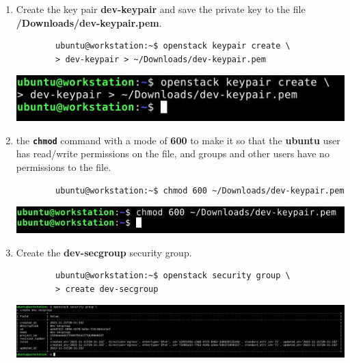 \documentclass[letterpaper, 12pt]{article}
\begin{document}
\begin{enumerate}
    \item Create the key pair \textbf{dev-keypair} and save the private key to the file
    \textbf{\texttildemid/Downloads/dev-keypair.pem}.
    \begin{lstlisting}
        ubuntu@workstation:~$ openstack keypair create \
        > dev-keypair > ~/Downloads/dev-keypair.pem
    \end{lstlisting}

    \begin{center}
        \includegraphics[width=\linewidth]{images/part4/step15.png}
    \end{center}

    \item the \textbf{\texttt{chmod}} command with a mode of \textbf{600} to make it so that the \textbf{ubuntu} user
    has read/write permissions on the file, and groups and other users have no permissions to the file.
    \begin{lstlisting}
        ubuntu@workstation:~$ chmod 600 ~/Downloads/dev-keypair.pem
    \end{lstlisting}

    \begin{center}
        \includegraphics[width=\linewidth]{images/part4/step16.png}
    \end{center}

    \item Create the \textbf{dev-secgroup} security group.
    \begin{lstlisting}
        ubuntu@workstation:~$ openstack security group \
        > create dev-secgroup
    \end{lstlisting}

    \begin{center}
        \includegraphics[width=\linewidth]{images/part4/step17.png}
    \end{center}


\end{enumerate}
\end{document}

